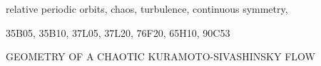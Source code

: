 \documentclass{siamltex}          %
\begin{document}
\begin{keywords}
relative periodic orbits, chaos, turbulence, continuous symmetry, {\KSe}
\end{keywords}

\begin{AMS}
35B05, 35B10, 37L05, 37L20, 76F20, 65H10, 90C53
\end{AMS}

\pagestyle{myheadings}
\thispagestyle{plain}
         {GEOMETRY OF A CHAOTIC KURAMOTO-SIVASHINSKY FLOW}








\appendix







\end{document}
